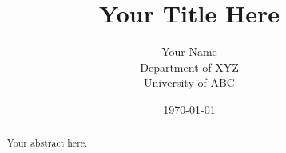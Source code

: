 \documentclass[a4paper,12pt]{article}
\title{Your Title Here}
\author{Your Name \\ Department of XYZ \\ University of ABC}
\date{\today}
\begin{document}

\maketitle
\clearpage

\begin{abstract}
    Your abstract here.
\end{abstract}
\clearpage

\tableofcontents
\listoffigures
\listoftables
\clearpage







\printbibliography{}
\end{document}
